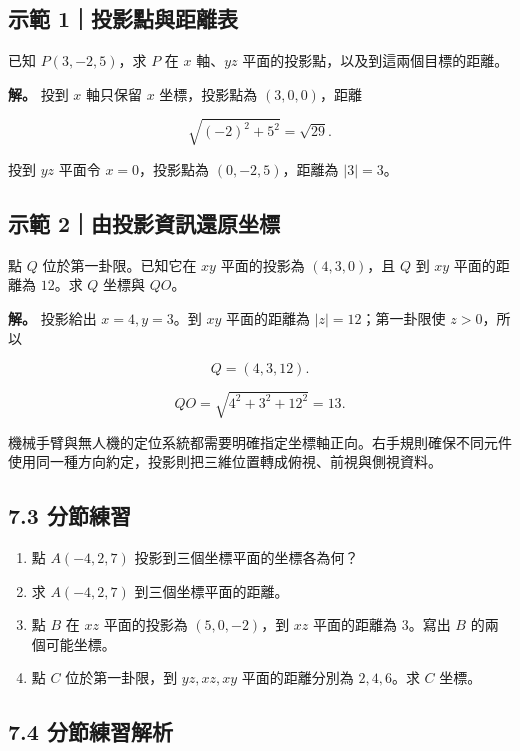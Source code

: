 \documentclass[11pt,a4paper]{article}
\providecommand{\tightlist}{%
  \setlength{\itemsep}{0pt}\setlength{\parskip}{0pt}}
\begin{document}
\subsection{示範 1｜投影點與距離表}\label{ux793aux7bc4-1ux6295ux5f71ux9edeux8207ux8dddux96e2ux8868}

已知 \(P(3,-2,5)\)，求 \(P\) 在 \(x\) 軸、\(yz\) 平面的投影點，以及到這兩個目標的距離。

\textbf{解。} 投到 \(x\) 軸只保留 \(x\) 坐標，投影點為 \((3,0,0)\)，距離

\[
\sqrt{(-2)^2+5^2}=\sqrt{29}.
\]

投到 \(yz\) 平面令 \(x=0\)，投影點為 \((0,-2,5)\)，距離為 \(|3|=3\)。

\subsection{示範 2｜由投影資訊還原坐標}\label{ux793aux7bc4-2ux7531ux6295ux5f71ux8cc7ux8a0aux9084ux539fux5750ux6a19}

點 \(Q\) 位於第一卦限。已知它在 \(xy\) 平面的投影為 \((4,3,0)\)，且 \(Q\) 到 \(xy\) 平面的距離為 \(12\)。求 \(Q\) 坐標與 \(QO\)。

\textbf{解。} 投影給出 \(x=4,y=3\)。到 \(xy\) 平面的距離為 \(|z|=12\)；第一卦限使 \(z>0\)，所以

\[
Q=(4,3,12).
\]

\[
QO=\sqrt{4^2+3^2+12^2}=13.
\]

機械手臂與無人機的定位系統都需要明確指定坐標軸正向。右手規則確保不同元件使用同一種方向約定，投影則把三維位置轉成俯視、前視與側視資料。

\subsection{7.3 分節練習}\label{ux5206ux7bc0ux7df4ux7fd2-6}

\begin{enumerate}
\def\labelenumi{\arabic{enumi}.}
\tightlist
\item
  點 \(A(-4,2,7)\) 投影到三個坐標平面的坐標各為何？
\item
  求 \(A(-4,2,7)\) 到三個坐標平面的距離。
\item
  點 \(B\) 在 \(xz\) 平面的投影為 \((5,0,-2)\)，到 \(xz\) 平面的距離為 \(3\)。寫出 \(B\) 的兩個可能坐標。
\item
  點 \(C\) 位於第一卦限，到 \(yz,xz,xy\) 平面的距離分別為 \(2,4,6\)。求 \(C\) 坐標。
\end{enumerate}

\subsection{7.4 分節練習解析}\label{ux5206ux7bc0ux7df4ux7fd2ux89e3ux6790-6}
\end{document}
